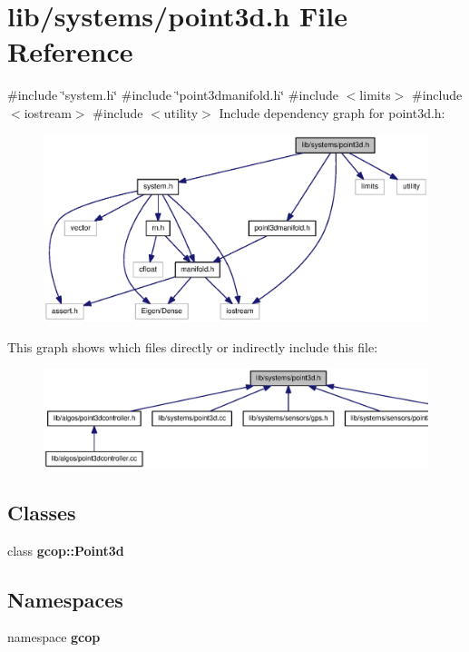 \section{lib/systems/point3d.h \-File \-Reference}
\label{point3d_8h}
{\ttfamily \#include \char`\"{}system.\-h\char`\"{}}\*
{\ttfamily \#include \char`\"{}point3dmanifold.\-h\char`\"{}}\*
{\ttfamily \#include $<$limits$>$}\*
{\ttfamily \#include $<$iostream$>$}\*
{\ttfamily \#include $<$utility$>$}\*
\-Include dependency graph for point3d.\-h\-:
\nopagebreak
\begin{figure}[H]
\begin{center}
\leavevmode
\includegraphics[width=350pt]{point3d_8h__incl}
\end{center}
\end{figure}
\-This graph shows which files directly or indirectly include this file\-:
\nopagebreak
\begin{figure}[H]
\begin{center}
\leavevmode
\includegraphics[width=350pt]{point3d_8h__dep__incl}
\end{center}
\end{figure}
\subsection*{\-Classes}
\begin{DoxyCompactItemize}
\item 
class {\bf gcop\-::\-Point3d}
\end{DoxyCompactItemize}
\subsection*{\-Namespaces}
\begin{DoxyCompactItemize}
\item 
namespace {\bf gcop}
\end{DoxyCompactItemize}
